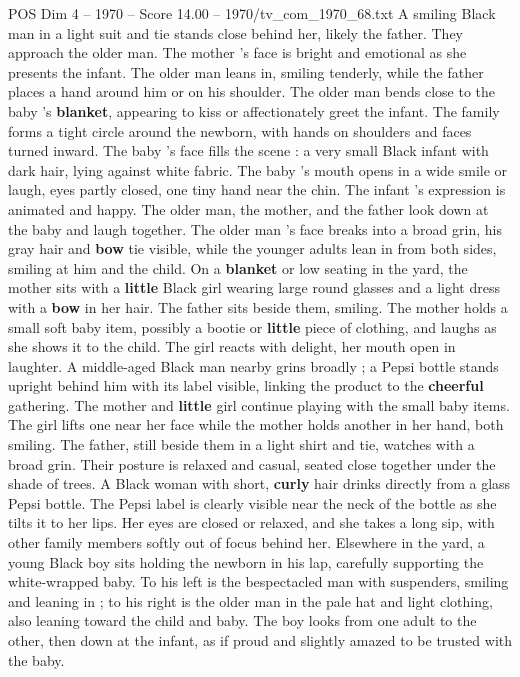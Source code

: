 \begin{textsample}{POS Dim 4 – 1970 – Score 14.00 – 1970/tv\_com\_1970\_68.txt}
A smiling Black man in a light suit and tie stands close behind her, likely the father.
They approach the older man.
The mother ’s face is bright and emotional as she presents the infant.
The older man leans in, smiling tenderly, while the father places a hand around him or on his shoulder.
The older man bends close to the baby ’s \textbf{blanket}, appearing to kiss or affectionately greet the infant.
The family forms a tight circle around the newborn, with hands on shoulders and faces turned inward.
The baby ’s face fills the scene : a very small Black infant with dark hair, lying against white fabric.
The baby ’s mouth opens in a wide smile or laugh, eyes partly closed, one tiny hand near the chin.
The infant ’s expression is animated and happy.
The older man, the mother, and the father look down at the baby and laugh together.
The older man ’s face breaks into a broad grin, his gray hair and \textbf{bow} tie visible, while the younger adults lean in from both sides, smiling at him and the child.
On a \textbf{blanket} or low seating in the yard, the mother sits with a \textbf{little} Black girl wearing large round glasses and a light dress with a \textbf{bow} in her hair.
The father sits beside them, smiling.
The mother holds a small soft baby item, possibly a bootie or \textbf{little} piece of clothing, and laughs as she shows it to the child.
The girl reacts with delight, her mouth open in laughter.
A middle-aged Black man nearby grins broadly ; a Pepsi bottle stands upright behind him with its label visible, linking the product to the \textbf{cheerful} gathering.
The mother and \textbf{little} girl continue playing with the small baby items.
The girl lifts one near her face while the mother holds another in her hand, both smiling.
The father, still beside them in a light shirt and tie, watches with a broad grin.
Their posture is relaxed and casual, seated close together under the shade of trees.
A Black woman with short, \textbf{curly} hair drinks directly from a glass Pepsi bottle.
The Pepsi label is clearly visible near the neck of the bottle as she tilts it to her lips.
Her eyes are closed or relaxed, and she takes a long sip, with other family members softly out of focus behind her.
Elsewhere in the yard, a young Black boy sits holding the newborn in his lap, carefully supporting the white-wrapped baby.
To his left is the bespectacled man with suspenders, smiling and leaning in ; to his right is the older man in the pale hat and light clothing, also leaning toward the child and baby.
The boy looks from one adult to the other, then down at the infant, as if proud and slightly amazed to be trusted with the baby.

\end{textsample}
